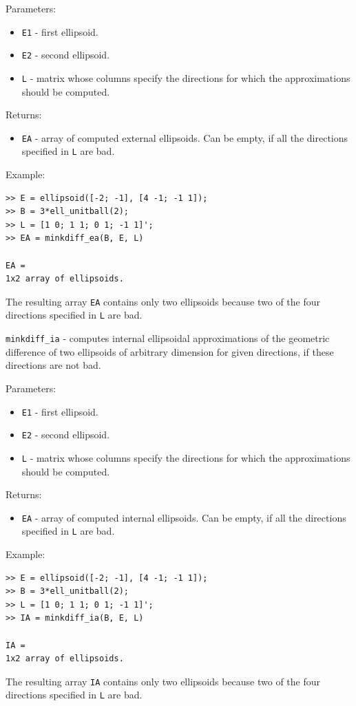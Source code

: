 \documentclass{report}
\begin{document}
Parameters:
\begin{itemize}
\item {\tt E1} - first ellipsoid.
\item {\tt E2} - second ellipsoid.
\item {\tt L} - matrix whose columns specify the directions for which
the approximations should be computed.
\end{itemize}

Returns:
\begin{itemize}
\item {\tt EA} - array of computed external ellipsoids. Can be empty, if
all the directions specified in {\tt L} are bad.
\end{itemize}

Example:
{\tt \begin{verbatim}
>> E = ellipsoid([-2; -1], [4 -1; -1 1]);
>> B = 3*ell_unitball(2);
>> L = [1 0; 1 1; 0 1; -1 1]';
>> EA = minkdiff_ea(B, E, L)

EA =
1x2 array of ellipsoids.
\end{verbatim} }
The resulting array {\tt EA} contains only two ellipsoids because two
of the four directions specified in {\tt L} are bad.

\newpage

{\Large {\tt minkdiff\_ia}} - computes internal ellipsoidal approximations
of the geometric difference of two ellipsoids of arbitrary dimension
for given directions, if these directions are not bad.

Parameters:
\begin{itemize}
\item {\tt E1} - first ellipsoid.
\item {\tt E2} - second ellipsoid.
\item {\tt L} - matrix whose columns specify the directions for which
the approximations should be computed.
\end{itemize}

Returns:
\begin{itemize}
\item {\tt EA} - array of computed internal ellipsoids. Can be empty, if
all the directions specified in {\tt L} are bad.
\end{itemize}

Example:
{\tt \begin{verbatim}
>> E = ellipsoid([-2; -1], [4 -1; -1 1]);
>> B = 3*ell_unitball(2);
>> L = [1 0; 1 1; 0 1; -1 1]';
>> IA = minkdiff_ia(B, E, L)

IA =
1x2 array of ellipsoids.
\end{verbatim} }
The resulting array {\tt IA} contains only two ellipsoids because two
of the four directions specified in {\tt L} are bad.
\end{document}
